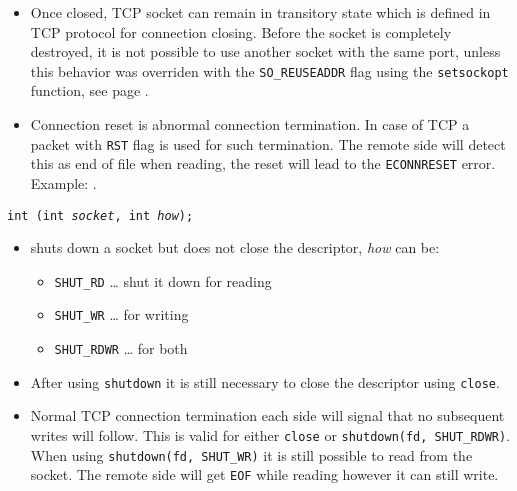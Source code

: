 \label{CLOSESOCKET}

\begin{itemize}
\item Once closed, TCP socket can remain in transitory state which is defined in
TCP protocol for connection closing. Before the socket is completely destroyed,
it is not possible to use another socket with the same port, unless this
behavior was overriden with the \texttt{SO\_REUSEADDR} flag using the
\texttt{setsockopt} function, see page \pageref{SETSOCKOPT}.
\item Connection reset is abnormal connection termination. In case of TCP
a packet with \texttt{RST} flag is used for such termination. The remote side
will detect this as end of file when reading, the reset will lead to the
\texttt{ECONNRESET} error. Example: .
\end{itemize}



\begin{slide}
\texttt{int (int \emph{socket}, int \emph{how});}
\begin{itemize}
\item shuts down a socket but does not close the descriptor, \emph{how} can be: 
    \begin{itemize}
    \item \texttt{SHUT\_RD} \dots{} shut it down for reading
    \item \texttt{SHUT\_WR} \dots{} for writing
    \item \texttt{SHUT\_RDWR} \dots{} for both
    \end{itemize}
\end{itemize}
\end{slide}

\begin{itemize}
\item After using \texttt{shutdown} it is still necessary to close the
descriptor using \texttt{close}.
\item Normal TCP connection termination each side will signal that no subsequent
writes will follow. This is valid for either \texttt{close} or
\texttt{shutdown(fd, SHUT\_RDWR)}. When using
\texttt{shutdown(fd, SHUT\_WR)} it is still possible to read from the socket.
The remote side will get \texttt{EOF} while reading however it can still write.
\end{itemize}

